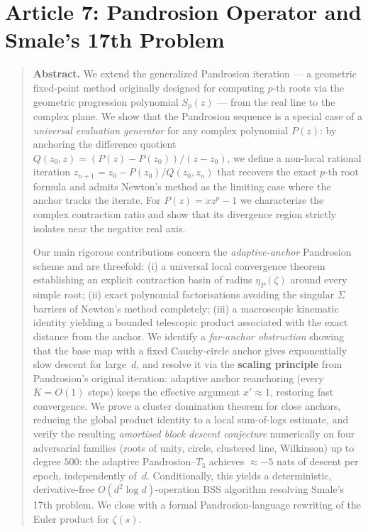 \documentclass[10pt,a4paper,oneside]{book}
\theoremstyle{definition}
\theoremstyle{remark}
\newenvironment{abstract}{\begin{quote}\small\textbf{Abstract.}}{\end{quote}}
\begin{document}
\chapter{Article 7: Pandrosion Operator and Smale's 17th Problem}
\graphicspath{{../figures/}}


\begin{abstract}
We extend the generalized Pandrosion iteration --- a geometric fixed-point method originally designed for computing $p$-th roots via the geometric progression polynomial $S_p(z)$ --- from the real line to the complex plane.  We show that the Pandrosion sequence is a special case of a \emph{universal evaluation generator} for any complex polynomial $P(z)$: by anchoring the difference quotient $Q(z_0, z) = (P(z) - P(z_0))/(z - z_0)$, we define a non-local rational iteration $z_{n+1} = z_0 - P(z_0)/Q(z_0, z_n)$ that recovers the exact $p$-th root formula and admits Newton's method as the limiting case where the anchor tracks the iterate.  For $P(z) = xz^p - 1$ we characterize the complex contraction ratio and show that its divergence region strictly isolates near the negative real axis.

Our main rigorous contributions concern the \emph{adaptive-anchor} Pandrosion scheme and are threefold: (i) a universal local convergence theorem establishing an explicit contraction basin of radius $\eta_P(\zeta)$ around every simple root; (ii) exact polynomial factorisations avoiding the singular $\Sigma$ barriers of Newton's method completely; (iii) a macroscopic kinematic identity yielding a bounded telescopic product associated with the exact distance from the anchor. We identify a \emph{far-anchor obstruction} showing that the base map with a fixed Cauchy-circle anchor gives exponentially slow descent for large~$d$, and resolve it via the \textbf{scaling principle} from Pandrosion's original iteration: adaptive anchor reanchoring (every $K = O(1)$ steps) keeps the effective argument $x' \approx 1$, restoring fast convergence.  We prove a cluster domination theorem for close anchors, reducing the global product identity to a local sum-of-logs estimate, and verify the resulting \emph{amortised block descent conjecture} numerically on four adversarial families (roots of unity, circle, clustered line, Wilkinson) up to degree $500$: the adaptive Pandrosion--$T_3$ achieves $\approx -5$ nats of descent per epoch, independently of~$d$.  Conditionally, this yields a deterministic, derivative-free $O(d^2\log d)$-operation BSS algorithm resolving Smale's 17th problem.  We close with a formal Pandrosion-language rewriting of the Euler product for $\zeta(s)$.
\end{abstract}
\end{document}
